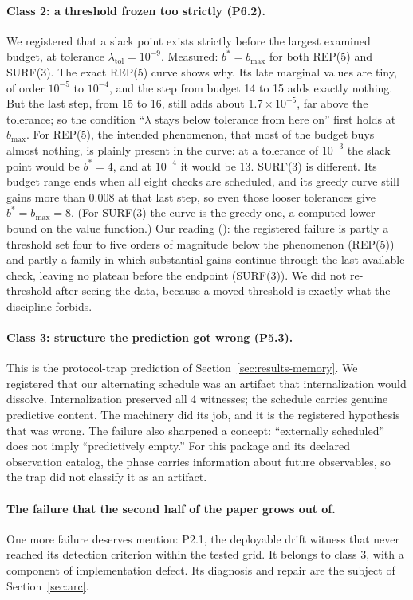 \paragraph{Class 2: a threshold frozen too strictly (P6.2).} We registered that a slack point exists strictly before the largest examined budget, at tolerance $\lambda_{\mathrm{tol}} = 10^{-9}$. Measured: $b^{*} = b_{\max}$ for both REP(5) and SURF(3). %
The exact REP(5) curve shows why. Its late marginal values are tiny, of order $10^{-5}$ to $10^{-4}$, and the step from budget 14 to 15 adds exactly nothing. But the last step, from 15 to 16, still adds about $1.7\times10^{-5}$, far above the tolerance; so the condition ``$\lambda$ stays below tolerance from here on'' first holds at $b_{\max}$. %
For REP(5), the intended phenomenon, that most of the budget buys almost nothing, is plainly present in the curve: at a tolerance of $10^{-3}$ the slack point would be $b^{*} = 4$, and at $10^{-4}$ it would be $13$. SURF(3) is different. Its budget range ends when all eight checks are scheduled, and its greedy curve still gains more than $0.008$ at that last step, so even those looser tolerances give $b^{*} = b_{\max} = 8$. (For SURF(3) the curve is the greedy one, a computed lower bound on the value function.) %
Our reading (\gInterp): the registered failure is partly a threshold set four to five orders of magnitude below the phenomenon (REP(5)) and partly a family in which substantial gains continue through the last available check, leaving no plateau before the endpoint (SURF(3)). We did not re-threshold after seeing the data, because a moved threshold is exactly what the discipline forbids.

\paragraph{Class 3: structure the prediction got wrong (P5.3).} This is the protocol-trap prediction of Section~\ref{sec:results-memory}. We registered that our alternating schedule was an artifact that internalization would dissolve. Internalization preserved all 4 witnesses; the schedule carries genuine predictive content. %
The machinery did its job, and it is the registered hypothesis that was wrong. The failure also sharpened a concept: ``externally scheduled'' does not imply ``predictively empty.'' For this package and its declared observation catalog, the phase carries information about future observables, so the trap did not classify it as an artifact.

\paragraph{The failure that the second half of the paper grows out of.} One more failure deserves mention: P2.1, the deployable drift witness that never reached its detection criterion within the tested grid. It belongs to class 3, with a component of implementation defect. Its diagnosis and repair are the subject of Section~\ref{sec:arc}.
